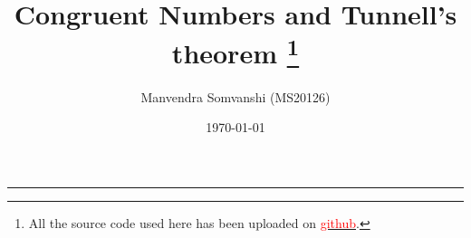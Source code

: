\documentclass[11pt,a4paper]{colorart}
\numberwithin{equation}{section}
\begin{document}
\title{\huge Congruent Numbers and Tunnell's theorem \footnote{All the source code used here has been uploaded on \href{https://github.com/ManuSomvanshi/ConguentNumber}{\textcolor{red}{github}}.}}
\author{Manvendra Somvanshi (MS20126)} 
\date{\today} 
\maketitle
\tableofcontents
\vspace{5pt}
\hrule
\vspace{6pt}



\end{document}
